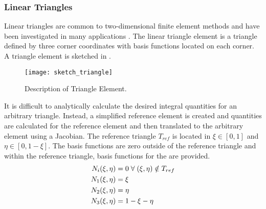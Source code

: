     \subsubsection{Linear Triangles}
      Linear triangles are common to two-dimensional finite element methods and
      have been investigated in many applications \cite{Hosseini2017} 
      \cite{Hosseini2013} \cite{Hosseini2015}. The linear triangle element is a
      triangle  defined by three corner coordinates with basis functions located 
      on each corner. A triangle element is sketched in 
      .
      \begin{figure}
        \centering
        \texttt{[image: sketch\_triangle]}
        \caption{Description of Triangle Element.}
        \label{fig:sketch_triangle}
      \end{figure}
      It is difficult to analytically calculate the desired integral quantities
      for an arbitrary triangle. Instead, a simplified reference element is
      created and quantities are calculated for the reference element and then
      translated to the arbitrary element using a Jacobian. 
      The reference triangle $T_{ref}$ is located in
      $\xi \in [0,1]$ and $\eta \in [0,1-\xi]$. The basis functions are zero
      outside of the reference triangle and within the reference triangle, 
      basis functions for the are provided.
      \begin{align}
        N_i(\xi,\eta) &= 0 \; \forall \; (\xi,\eta) \notin T_{ref} \\
        N_1(\xi,\eta) &= \xi \\
        N_2(\xi,\eta) &= \eta \\
        N_3(\xi,\eta) &= 1-\xi-\eta
      \end{align}
      

